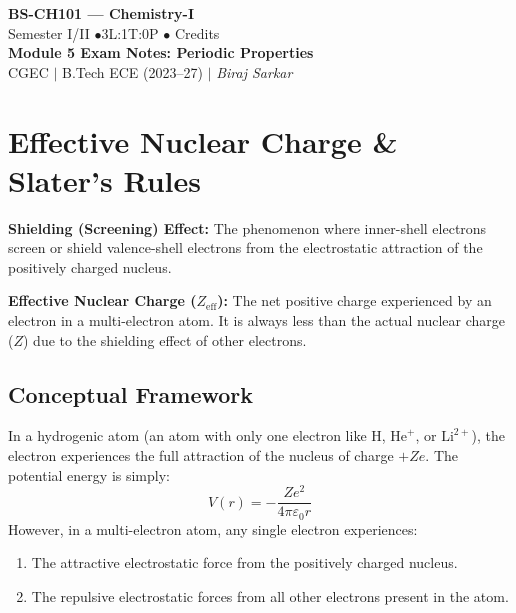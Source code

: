 \documentclass[12pt,a4paper]{article}
\begin{document}
\begin{center}
  {\LARGE\bfseries\color{myred} BS-CH101 --- Chemistry-I}\\[5pt]
  {\normalsize\color{mydark} Semester I/II \quad$\bullet$\quad 3L:1T:0P \quad$\bullet$ Credits}\\[3pt]
  {\normalsize\color{myteal}\textbf{Module 5 Exam Notes: Periodic Properties}}\\[3pt]
  {\small\color{mydark} CGEC \;$|$\; B.Tech ECE (2023--27) \;$|$\; \textit{Biraj Sarkar}}
\end{center}

\noindent{\color{myred}\rule{\linewidth}{1.2pt}}
\vspace{10pt}

\tableofcontents
\newpage

\section{Effective Nuclear Charge \& Slater's Rules}

\begin{tcolorbox}[defbox, title={Definitions: Shielding and Effective Nuclear Charge}]
  \textbf{Shielding (Screening) Effect:} The phenomenon where inner-shell electrons screen or shield valence-shell electrons from the electrostatic attraction of the positively charged nucleus.
  \par\vspace{4pt}
  \textbf{Effective Nuclear Charge ($Z_{\text{eff}}$):} The net positive charge experienced by an electron in a multi-electron atom. It is always less than the actual nuclear charge ($Z$) due to the shielding effect of other electrons.
\end{tcolorbox}

\subsection{Conceptual Framework}
In a hydrogenic atom (an atom with only one electron like $\text{H}$, $\text{He}^+$, or $\text{Li}^{2+}$), the electron experiences the full attraction of the nucleus of charge $+Ze$. The potential energy is simply:
\[ V(r) = -\frac{Ze^2}{4\pi\varepsilon_0 r} \]
However, in a multi-electron atom, any single electron experiences:
\begin{enumerate}
  \item The attractive electrostatic force from the positively charged nucleus.
  \item The repulsive electrostatic forces from all other electrons present in the atom.
\end{enumerate}
\end{document}
